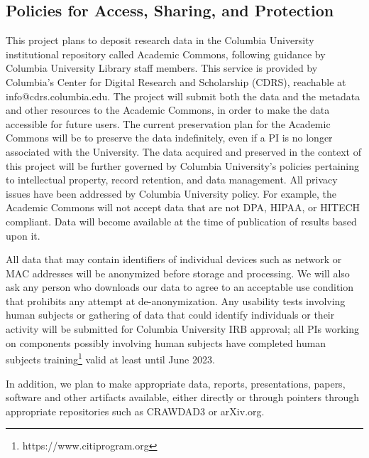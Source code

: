 \documentclass[11pt]{article}
\begin{document}
\subsection*{Policies for Access, Sharing, and Protection}

This project plans to deposit research data in the Columbia University institutional repository called Academic Commons, following guidance by Columbia University Library staff members. This service is provided by Columbia's Center for Digital Research and Scholarship (CDRS), reachable at info@cdrs.columbia.edu. The project will submit both the data and the metadata and other resources to the Academic Commons, in order to make the data accessible for future users.  The current preservation plan for the Academic Commons will be to preserve the data indefinitely, even if a PI is no longer associated with the University. The data acquired and preserved in the context of this project will be further governed by Columbia University's policies pertaining to intellectual property, record retention, and data management. All privacy issues have been addressed by Columbia University policy. For example, the Academic Commons will not accept data that are not DPA, HIPAA, or HITECH compliant. Data will become available at the time of publication of results based upon it.

All data that may contain identifiers of individual devices such as network or MAC addresses will be anonymized before storage and processing. We will also ask any person who downloads our data to agree to an acceptable use condition that prohibits any attempt at de-anonymization. Any usability tests involving human subjects or gathering of data that could identify individuals or their activity will be submitted for Columbia University IRB approval; all PIs working on components possibly involving human subjects have completed human subjects training\footnote{https://www.citiprogram.org} valid at least until June 2023.

In addition, we plan to make appropriate data, reports, presentations, papers, software and other artifacts available, either directly or through pointers through appropriate repositories such as CRAWDAD3 or arXiv.org.
\end{document}
